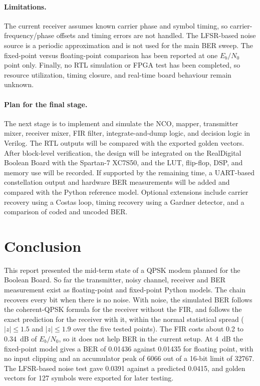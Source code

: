 \documentclass[10pt,twocolumn,letterpaper]{article}
\begin{document}
\paragraph{Limitations.}
The current receiver assumes known carrier phase and symbol timing, so carrier-frequency/phase offsets and timing errors are not handled. The LFSR-based noise source is a periodic approximation and is not used for the main BER sweep. The fixed-point versus floating-point comparison has been reported at one $E_b/N_0$ point only. Finally, no RTL simulation or FPGA test has been completed, so resource utilization, timing closure, and real-time board behaviour remain unknown.

\paragraph{Plan for the final stage.}
The next stage is to implement and simulate the NCO, mapper, transmitter mixer, receiver mixer, FIR filter, integrate-and-dump logic, and decision logic in Verilog. The RTL outputs will be compared with the exported golden vectors. After block-level verification, the design will be integrated on the RealDigital Boolean Board with the Spartan-7 XC7S50, and the LUT, flip-flop, DSP, and memory use will be recorded. If supported by the remaining time, a UART-based constellation output and hardware BER measurements will be added and compared with the Python reference model. Optional extensions include carrier recovery using a Costas loop, timing recovery using a Gardner detector, and a comparison of coded and uncoded BER.

\section{Conclusion}
This report presented the mid-term state of a QPSK modem planned for the
Boolean Board. So far the transmitter, noisy channel, receiver and BER
measurement exist as floating-point and fixed-point Python models. The chain
recovers every bit when there is no noise. With noise, the simulated BER
follows the coherent-QPSK formula for the receiver without the FIR, and
follows the exact prediction for the receiver with it, within the normal
statistical spread ($|z|\le 1.5$ and $|z|\le 1.9$ over the five tested
points). The FIR costs about 0.2 to 0.34~dB of $E_b/N_0$, so it does not help
BER in the current setup. At 4~dB the fixed-point model gives a BER of
0.01436 against 0.01435 for floating point, with no input clipping and an
accumulator peak of 6066 out of a 16-bit limit of 32767. The LFSR-based noise
test gave 0.0391 against a predicted 0.0415, and golden vectors for 127
symbols were exported for later testing.
\end{document}
